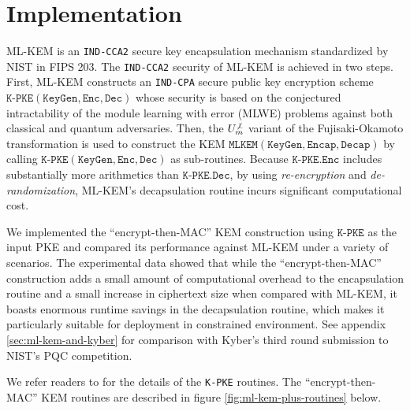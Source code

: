 \documentclass[journal=tches,submission]{iacrtrans}
\newcommand{\keygen}{\texttt{KeyGen}}
\newcommand{\encrypt}{\texttt{Enc}}
\newcommand{\decrypt}{\texttt{Dec}}
\newcommand{\encap}{\texttt{Encap}}
\newcommand{\decap}{\texttt{Decap}}
\begin{document}
\section{Implementation}\label{sec:implementation}
ML-KEM is an \texttt{IND-CCA2} secure key encapsulation mechanism standardized by NIST in FIPS 203. The \texttt{IND-CCA2} security of ML-KEM is achieved in two steps. First, ML-KEM constructs an \texttt{IND-CPA} secure public key encryption scheme $\texttt{K-PKE}(\keygen, \encrypt, \decrypt)$ whose security is based on the conjectured intractability of the module learning with error (MLWE) problems against both classical and quantum adversaries. Then, the $U^{\not\bot}_m$ variant of the Fujisaki-Okamoto transformation \cite{hofheinz2017modular} is used to construct the KEM $\texttt{MLKEM}(\keygen, \encap, \decap)$ by calling $\texttt{K-PKE}(\keygen, \encrypt, \decrypt)$ as sub-routines. Because $\texttt{K-PKE}.\encrypt$ includes substantially more arithmetics than $\texttt{K-PKE}.\decrypt$, by using \textit{re-encryption} and \textit{de-randomization}, ML-KEM's decapsulation routine incurs significant computational cost. 

We implemented the ``encrypt-then-MAC'' KEM construction using $\texttt{K-PKE}$ as the input PKE and compared its performance against ML-KEM under a variety of scenarios. The experimental data showed that while the ``encrypt-then-MAC'' construction adds a small amount of computational overhead to the encapsulation routine and a small increase in ciphertext size when compared with ML-KEM, it boasts enormous runtime savings in the decapsulation routine, which makes it particularly suitable for deployment in constrained environment. See appendix \ref{sec:ml-kem-and-kyber} for comparison with Kyber's third round submission to NIST's PQC competition.

We refer readers to \cite{FIPS203} for the details of the \texttt{K-PKE} routines. The ``encrypt-then-MAC'' KEM routines are described in figure \ref{fig:ml-kem-plus-routines} below.
\end{document}
